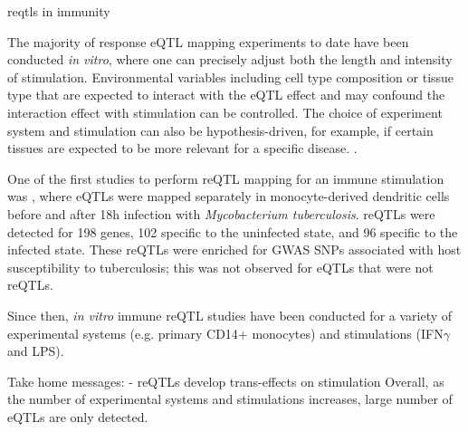 reqtls in immunity

The majority of response eQTL mapping experiments to date have been conducted \textit{in vitro}, where one can precisely adjust both the length and intensity of stimulation.
Environmental variables including cell type composition or tissue type that are expected to interact with the eQTL effect and may confound the interaction effect with stimulation can be controlled.
The choice of experiment system and stimulation can also be hypothesis-driven, for example, if certain tissues are expected to be more relevant for a specific disease. 
.

One of the first studies to perform \gls{reQTL} mapping for an immune stimulation was \autocite{barreiro2012DecipheringGeneticArchitecture}, where eQTLs were mapped separately in monocyte-derived dendritic cells before and after 18h infection with \textit{Mycobacterium tuberculosis}.
reQTLs were detected for 198 genes, 102 specific to the uninfected state, and 96 specific to the infected state. 
These reQTLs were enriched for GWAS SNPs associated with host susceptibility to tuberculosis; this was not observed for eQTLs that were not reQTLs.


Since then, \textit{in vitro} immune reQTL studies have been conducted for a variety of experimental systems (e.g. primary CD14+ monocytes\autocite{fairfax2014InnateImmuneActivity}) and stimulations (IFN$\gamma$ and LPS\autocite{fairfax2014GeneticsGeneExpression}).

Take home messages:
- reQTLs develop trans-effects on stimulation \autocite{fairfax2014InnateImmuneActivity}
Overall, as the number of experimental systems and stimulations increases, large number of eQTLs are only detected.

